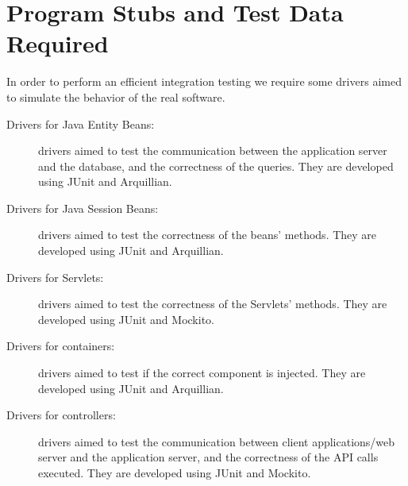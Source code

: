 \section{Program Stubs and Test Data Required} \label{sec stubs}

In order to perform an efficient integration testing we require some drivers aimed to simulate the behavior of the real software. 

\begin{description}
\item[Drivers for Java Entity Beans: ] drivers aimed to test the communication between the application server and the database, and the correctness of the queries. They are developed using JUnit and Arquillian.
\item[Drivers for Java Session Beans: ] drivers aimed to test the correctness of the beans' methods. They are developed using JUnit and Arquillian.
\item[Drivers for Servlets: ] drivers aimed to test the correctness of the Servlets' methods. They are developed using JUnit and Mockito.
\item[Drivers for containers: ] drivers aimed to test if the correct component is injected. They are developed using JUnit and Arquillian.
\item[Drivers for controllers: ] drivers aimed to test the communication between client applications/web server and the application server, and the correctness of the API calls executed. They are developed using JUnit and Mockito.

\end{description}